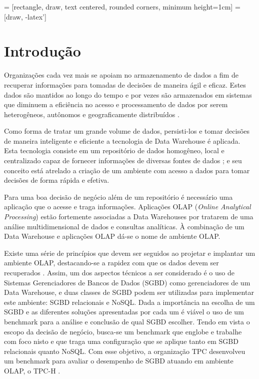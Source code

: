 \documentclass[conference]{IEEEtran}
\begin{document}
\IEEEpeerreviewmaketitle

 = [rectangle, draw, 
    text centered, rounded corners, minimum height=1cm]
 = [draw, -latex']


\section{Introdução}

Organizações cada vez mais se apoiam no armazenamento de dados a fim de recuperar informações para tomadas de decisões de maneira ágil e eficaz. Estes dados são mantidos ao longo do tempo e por vezes são armazenados em sistemas que diminuem a eficiência no acesso e processamento de dados por serem heterogêneos, autônomos e geograficamente distribuídos \cite{wrembel2007data}.

Como forma de tratar um grande volume de dados, persisti-los e tomar decisões de maneira inteligente e eficiente a tecnologia de Data Warehouse é aplicada. Esta tecnologia consiste em um repositório de dados homogêneo, local e centralizado capaz de fornecer informações de diversas fontes de dados \cite{wrembel2007data}; e seu conceito está atrelado a criação de um ambiente com acesso a dados para tomar decisões de forma rápida e efetiva.

Para uma boa decisão de negócio além de um repositório é necessário uma aplicação que o acesse e traga informações. Aplicações OLAP (\textit{Online Analytical Processing}) estão fortemente associadas a Data Warehouses por tratarem de uma análise multidimensional de dados e consultas analíticas. À combinação de um Data Warehouse e aplicações OLAP dá-se o nome de ambiente OLAP.

Existe uma série de princípios que devem ser seguidos ao projetar e implantar um ambiente OLAP, destacando-se a rapidez com que os dados devem ser recuperados \cite{codd1998providing, kimball2002dw, wrembel2007data}. Assim, um dos aspectos técnicos a ser considerado é o uso de Sistemas Gerenciadores de Bancos de Dados (SGBD) como gerenciadores de um Data Warehouse, e duas classes de SGBD podem ser utilizadas para implementar este ambiente: SGBD relacionais e NoSQL. Dada a importância na escolha de um SGBD e as diferentes soluções apresentadas por cada um é viável o uso de um benchmark para a análise e conclusão de qual SGBD escolher. Tendo em vista o escopo da decisão de negócio, busca-se um benchmark que englobe e trabalhe com foco nisto e que traga uma configuração que se aplique tanto em SGBD relacionais quanto NoSQL. Com esse objetivo, a organização TPC \cite{tpc2017page} desenvolveu um benchmark para avaliar o desempenho de SGBD atuando em ambiente OLAP, o TPC-H \cite{tpch2017page}. 
\end{document}
